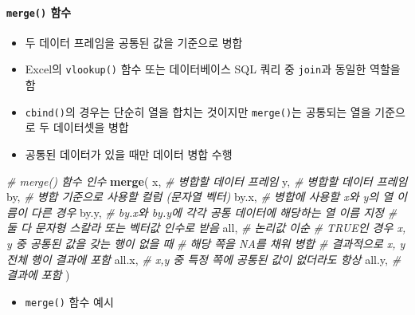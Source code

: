 \documentclass[
  11pt,
]{krantz}
\newenvironment{Shaded}{\begin{snugshade}}{\end{snugshade}}
\newcommand{\CommentTok}[1]{\textcolor[rgb]{0.37,0.37,0.37}{\textit{#1}}}
\newcommand{\KeywordTok}[1]{\textcolor[rgb]{0.27,0.27,0.27}{\textbf{#1}}}
\newcommand{\NormalTok}[1]{#1}
\providecommand{\tightlist}{%
  \setlength{\itemsep}{0pt}\setlength{\parskip}{0pt}}
\begin{document}
\hypertarget{merge}{%
\paragraph{\texorpdfstring{\texttt{merge()} 함수}{merge() 함수}}\label{merge}}

\begin{itemize}
\tightlist
\item
  두 데이터 프레임을 공통된 값을 기준으로 병합
\item
  Excel의 \texttt{vlookup()} 함수 또는 데이터베이스 SQL 쿼리 중 \texttt{join}과 동일한 역할을 함
\item
  \texttt{cbind()}의 경우는 단순히 열을 합치는 것이지만 \texttt{merge()}는 공통되는 열을 기준으로 두 데이터셋을 병합
\item
  공통된 데이터가 있을 때만 데이터 병합 수행
\end{itemize}

\footnotesize

\begin{Shaded}
\begin{Highlighting}[]
\CommentTok{# merge() 함수 인수 }
\KeywordTok{merge}\NormalTok{(}
\NormalTok{  x, }\CommentTok{# 병합할 데이터 프레임}
\NormalTok{  y, }\CommentTok{# 병합할 데이터 프레임}
\NormalTok{  by, }\CommentTok{# 병합 기준으로 사용할 컬럼 (문자열 벡터)}
\NormalTok{  by.x, }\CommentTok{# 병합에 사용할 x와 y의 열 이름이 다른 경우}
\NormalTok{  by.y, }\CommentTok{# by.x와 by.y에 각각 공통 데이터에 해당하는 열 이름 지정}
        \CommentTok{# 둘 다 문자형 스칼라 또는 벡터값 인수로 받음}
\NormalTok{  all, }\CommentTok{# 논리값 이순}
       \CommentTok{# TRUE인 경우 x, y 중 공통된 값을 갖는 행이 없을 때}
       \CommentTok{# 해당 쪽을 NA를 채워 병합}
       \CommentTok{# 결과적으로 x, y 전체 행이 결과에 포함}
\NormalTok{  all.x, }\CommentTok{# x,y 중 특정 쪽에 공통된 값이 없더라도 항상 }
\NormalTok{  all.y, }\CommentTok{# 결과에 포함}
\NormalTok{)}
\end{Highlighting}
\end{Shaded}

\normalsize

\begin{itemize}
\tightlist
\item
  \texttt{merge()} 함수 예시
\end{itemize}

\footnotesize
\end{document}
